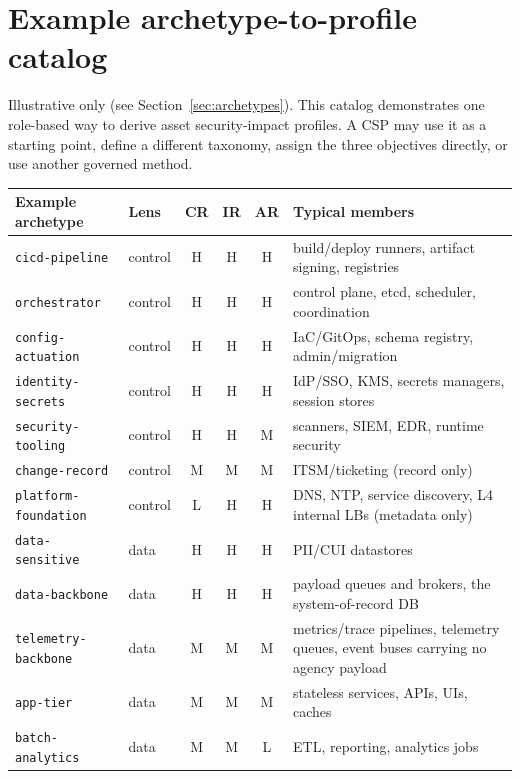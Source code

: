\documentclass[11pt]{article}
\newcommand{\code}[1]{\texttt{#1}}
\begin{document}
\appendix
\section{Example archetype-to-profile catalog}
\label{app:catalog}
Illustrative only (see Section~\ref{sec:archetypes}). This catalog demonstrates one
role-based way to derive asset security-impact profiles. A CSP may use it as a
starting point, define a different taxonomy, assign the three objectives directly,
or use another governed method.

\begin{table}[H]
\centering
\renewcommand{\arraystretch}{1.2}
\footnotesize
\setlength{\tabcolsep}{5pt}
\begin{tabular}{l l c c c >{\raggedright\arraybackslash}p{}}
\toprule
\textbf{Example archetype} & \textbf{Lens} & \textbf{CR} & \textbf{IR} & \textbf{AR} & \textbf{Typical members} \\
\midrule
\code{cicd-pipeline}      & control & H & H & H & build/deploy runners, artifact signing, registries \\
\code{orchestrator}       & control & H & H & H & control plane, etcd, scheduler, coordination \\
\code{config-actuation}   & control & H & H & H & IaC/GitOps, schema registry, admin/migration \\
\code{identity-secrets}   & control & H & H & H & IdP/SSO, KMS, secrets managers, session stores \\
\code{security-tooling}   & control & H & H & M & scanners, SIEM, EDR, runtime security \\
\code{change-record}      & control & M & M & M & ITSM/ticketing (record only) \\
\code{platform-foundation}& control & L & H & H & DNS, NTP, service discovery, L4 internal LBs (metadata only) \\
\code{data-sensitive}     & data    & H & H & H & PII/CUI datastores \\
\code{data-backbone}      & data    & H & H & H & payload queues and brokers, the system-of-record DB \\
\code{telemetry-backbone} & data    & M & M & M & metrics/trace pipelines, telemetry queues, event buses carrying no agency payload \\
\code{app-tier}           & data    & M & M & M & stateless services, APIs, UIs, caches \\
\code{batch-analytics}    & data    & M & M & L & ETL, reporting, analytics jobs \\

\end{tabular}
\end{table}
\end{document}
